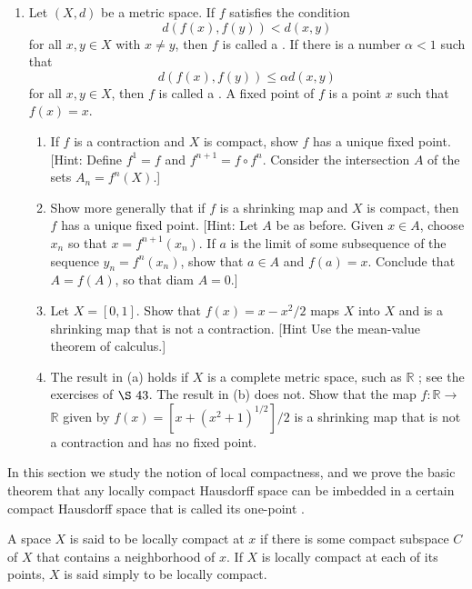 \begin{enumerate}[itemsep=0.4em, parsep=0pt, topsep=0pt, partopsep=0pt, leftmargin=*, label=\arabic*., ref=\arabic*]
\item Let \((X, d)\) be a metric space. If \(f\) satisfies the condition \[ d( {f(x),f( y) }) < d( {x,y}) \] for all \(x,y \in X\) with \(x \neq y\), then \(f\) is called a . If there is a number \(\alpha < 1\) such that \[ d( {f(x),f( y) }) \leq {\alpha d}( {x,y}) \] for all \(x,y \in X\), then \(f\) is called a . A fixed point of \(f\) is a point \(x\) such that \(f(x) = x\).
 \begin{enumerate}[itemsep=0.2em, parsep=0pt, topsep=0pt, partopsep=0pt, leftmargin=*, label=(\alph*), align=left]
 \item If \(f\) is a contraction and \(X\) is compact, show \(f\) has a unique fixed point. [Hint: Define \(f^{1} = f\) and \(f^{n + 1} = f \circ {f}^{n}\). Consider the intersection \(A\) of the sets \(A_{n} = f^{n}( X)\).]
 \item Show more generally that if \(f\) is a shrinking map and \(X\) is compact, then \(f\) has a unique fixed point. [Hint: Let \(A\) be as before. Given \(x \in A\), choose \(x_{n}\) so that \(x = f^{n + 1}( x_{n})\). If \(a\) is the limit of some subsequence of the sequence \(y_{n} = f^{n}( x_{n})\), show that \(a \in A\) and \(f( a) = x\). Conclude that \(A = f( A)\), so that diam \(A = 0\).]
 \item Let \(X = [ {0,1}]\). Show that \(f(x) = x - x^{2}/2\) maps \(X\) into \(X\) and is a shrinking map that is not a contraction. [Hint Use the mean-value theorem of calculus.]
 \item The result in (a) holds if \(X\) is a complete metric space, such as \(\mathbb{R}\) ; see the exercises of \(\S\ {43}\). The result in (b) does not. Show that the map \(f : \mathbb{R} \rightarrow\) \(\mathbb{R}\) given by \(f(x) = [ {x + {( x^{2} + 1) }^{1/2}}] /2\) is a shrinking map that is not a contraction and has no fixed point.
 \end{enumerate}
\end{enumerate}

In this section we study the notion of local compactness, and we prove the basic theorem that any locally compact Hausdorff space can be imbedded in a certain compact Hausdorff space that is called its one-point .

\begin{definition}
 A space \(X\) is said to be locally compact at \(x\) if there is some compact subspace \(C\) of \(X\) that contains a neighborhood of \(x\). If \(X\) is locally compact at each of its points, \(X\) is said simply to be locally compact.
\end{definition}

